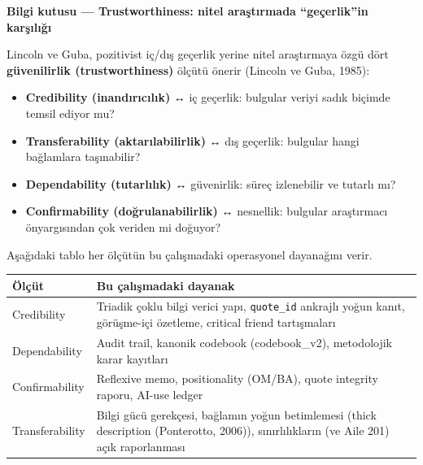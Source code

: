 \documentclass[
  turkish,
  a4paper,
  DIV=11,
  numbers=noendperiod]{scrreprt}
\newcounter{none} %
\providecommand{\tightlist}{%
  \setlength{\itemsep}{0pt}\setlength{\parskip}{0pt}}
\begin{document}
\begin{tcolorbox}[enhanced jigsaw, arc=.35mm, bottomrule=.15mm, bottomtitle=1mm, breakable, colback=white, colbacktitle=quarto-callout-note-color!10!white, colframe=quarto-callout-note-color-frame, coltitle=black, left=2mm, leftrule=.75mm, opacityback=0, opacitybacktitle=0.6, rightrule=.15mm, title=\textcolor{quarto-callout-note-color}{\faInfo}\hspace{0.5em}{Not}, titlerule=0mm, toprule=.15mm, toptitle=1mm]

\textbf{Bilgi kutusu --- Trustworthiness: nitel araştırmada
``geçerlik''in karşılığı}

Lincoln ve Guba, pozitivist iç/dış geçerlik yerine nitel araştırmaya
özgü dört \textbf{güvenilirlik (trustworthiness)} ölçütü önerir (Lincoln
ve Guba, 1985):

\begin{itemize}
\tightlist
\item
  \textbf{Credibility (inandırıcılık)} ↔ iç geçerlik: bulgular veriyi
  sadık biçimde temsil ediyor mu?
\item
  \textbf{Transferability (aktarılabilirlik)} ↔ dış geçerlik: bulgular
  hangi bağlamlara taşınabilir?
\item
  \textbf{Dependability (tutarlılık)} ↔ güvenirlik: süreç izlenebilir ve
  tutarlı mı?
\item
  \textbf{Confirmability (doğrulanabilirlik)} ↔ nesnellik: bulgular
  araştırmacı önyargısından çok veriden mi doğuyor?
\end{itemize}

Aşağıdaki tablo her ölçütün bu çalışmadaki operasyonel dayanağını verir.

\end{tcolorbox}

{\def\LTcaptype{none} %
\begin{longtable}[]{@{}
  >{\raggedright\arraybackslash}p{}
  >{\raggedright\arraybackslash}p{}@{}}
\toprule\noalign{}
\begin{minipage}[b]{\linewidth}\raggedright
Ölçüt
\end{minipage} & \begin{minipage}[b]{\linewidth}\raggedright
Bu çalışmadaki dayanak
\end{minipage} \\
\midrule\noalign{}
\endhead
\bottomrule\noalign{}
\endlastfoot
Credibility & Triadik çoklu bilgi verici yapı, \texttt{quote\_id}
ankrajlı yoğun kanıt, görüşme-içi özetleme, critical friend
tartışmaları \\
Dependability & Audit trail, kanonik codebook (codebook\_v2),
metodolojik karar kayıtları \\
Confirmability & Reflexive memo, positionality (OM/BA), quote integrity
raporu, AI-use ledger \\
Transferability & Bilgi gücü gerekçesi, bağlamın yoğun betimlemesi
(thick description (Ponterotto, 2006)), sınırlılıkların (ve Aile 201)
açık raporlanması \\
\end{longtable}
}
\end{document}
